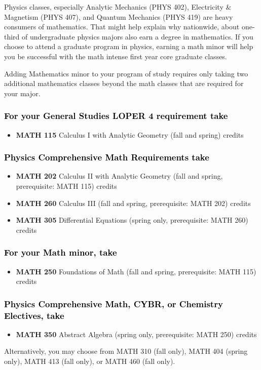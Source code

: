 \documentclass[10pt]{article}
\newenvironment{mypar}[2]
   {\begin{list}{}%
     {\setlength\leftmargin{#1}
     \setlength\rightmargin{#2}}
     \item[]}
   {\end{list}}
\newcommand{\calcone}{\textbf{MATH 115} Calculus I with Analytic Geometry (fall and spring) \dotfill 5 credits}
\newcommand{\calctwo}{\textbf{MATH 202} Calculus II with Analytic Geometry (fall and spring, prerequisite: MATH 115) \dotfill 5 credits }
\newcommand{\foundations}{\textbf{MATH 250} Foundations of Math (fall and spring, prerequisite: MATH 115)  \dotfill 3 credits}
\newcommand{\calcthree}{\textbf{MATH 260} Calculus III  (fall and spring, prerequisite: MATH 202) \dotfill 5 credits}
\newcommand{\diffeq}{\textbf{MATH 305}	Differential Equations (spring only, prerequisite: MATH 260) \dotfill 	3 credits}
\newcommand{\abstractalgebra}{\textbf{MATH 350}	Abstract Algebra (spring only, prerequisite: MATH 250) \dotfill 	3 credits}
\begin{document}
\noindent Physics classes, especially  Analytic Mechanics (PHYS 402),
Electricity \& Magnetism (PHYS 407), and Quantum Mechanics (PHYS 419)
are heavy consumers of mathematics. That might help explain why nationwide, about one-third of undergraduate physics majors also earn a degree in mathematics. If you choose to attend a graduate program in physics, earning a math minor will help you be successful with the math intense first year core graduate classes.

 Adding Mathematics minor to your program of study requires only taking two additional mathematics classes beyond the math classes that are required for your major.


\subsubsection*{\textcolor{black}{For your General Studies LOPER 4 requirement take}}
\begin{itemize}
\item \calcone
\end{itemize}


\subsubsection*{\textcolor{black}{Physics Comprehensive Math Requirements take}}
\begin{itemize}
 \item \calctwo
 \item \calcthree
 \item \diffeq
\end{itemize}

\subsubsection*{\textcolor{black}{For your Math minor, take}}
\begin{itemize}
\item \foundations
\end{itemize}

\subsubsection*{\textcolor{black}{Physics Comprehensive Math, CYBR, or Chemistry Electives, take}}
\begin{itemize}
\item \abstractalgebra
\end{itemize}
\begin{mypar}{0.5cm}{0.5cm} Alternatively, you may choose from MATH 310 (fall only), MATH 404 (spring only), MATH 413 (fall only), or MATH 460 (fall only).  \end{mypar}
\end{document}
